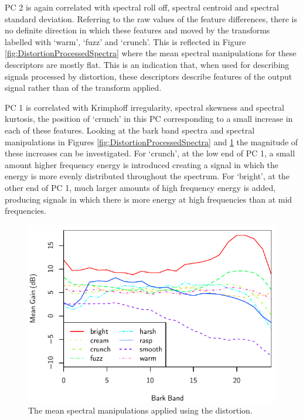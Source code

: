 			PC 2 is again correlated with spectral roll off, spectral centroid and spectral standard deviation.
			Referring to the raw values of the feature differences, there is no definite direction in which
			these features and moved by the transforms labelled with `warm', `fuzz' and `crunch'. This is
			reflected in Figure \ref{fig:DistortionProcessedSpectra} where the mean spectral manipulations for
			these descriptors are mostly flat. This is an indication that, when used for describing signals
			processed by distortion, these descriptors describe features of the output signal rather than of
			the transform applied.

			PC 1 is correlated with Krimphoff irregularity, spectral skewness and spectral kurtosis, the
			position of `crunch' in this PC corresponding to a small increase in each of these features.
			Looking at the bark band spectra and spectral manipulations in Figures
			\ref{fig:DistortionProcessedSpectra} and \ref{fig:DistortionDifferenceSpectra} the magnitude of
			these increases can be investigated. For `crunch', at the low end of PC 1, a small amount higher
			frequency energy is introduced creating a signal in which the energy is more evenly distributed
			throughout the spectrum. For `bright', at the other end of PC 1, much larger amounts of high
			frequency energy is added, producing signals in which there is more energy at high frequencies than
			at mid frequencies.

			\begin{figure}[h!]
				\centering
				\includegraphics{chapter4/Images/DistortionDifferenceSpectra.pdf}
				\caption{The mean spectral manipulations applied using the distortion.}
				\label{fig:DistortionDifferenceSpectra}
			\end{figure}

